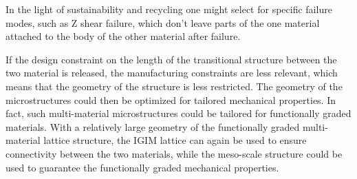 In the light of sustainability and recycling one might select for specific failure modes, such as Z shear failure, which don't leave parts of the one material attached to the body of the other material after failure.

If the design constraint on the length of the transitional structure between the two material is released,
the manufacturing constraints are less relevant, which means that the geometry of the structure is less restricted.
The geometry of the microstructures could then be optimized for tailored mechanical properties.
In fact, such multi-material microstructures could be tailored for functionally graded materials.
With a relatively large geometry of the functionally graded multi-material lattice structure,
the IGIM lattice can again be used to ensure connectivity between the two materials,
while the meso-scale structure could be used to guarantee the functionally graded mechanical properties.
